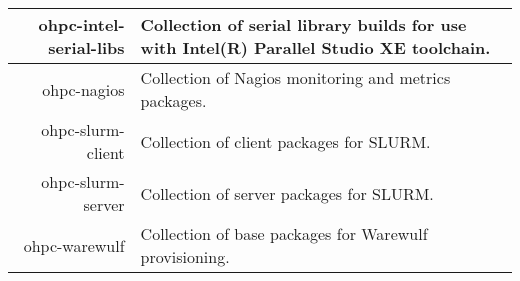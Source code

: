 \begin{tabularx}{\textwidth}{r|X}
\hline
ohpc-intel-serial-libs & Collection of serial library builds for use with Intel(R) Parallel Studio XE toolchain. \\ 
\hline
ohpc-nagios & Collection of Nagios monitoring and metrics packages. \\ 
\hline
ohpc-slurm-client & Collection of client packages for SLURM. \\ 
\hline
ohpc-slurm-server & Collection of server packages for SLURM. \\ 
\hline
ohpc-warewulf & Collection of base packages for Warewulf provisioning. \\ 
\hline
\bottomrule
\end{tabularx}
